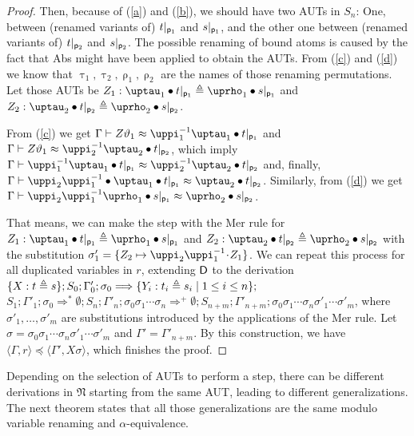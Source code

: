 \documentclass{llncs}
\newcommand{\Lra}{\Longrightarrow}
\newcommand{\frN}{\mathfrak N}
\newcommand{\permap}{{\mkern 1mu\cdot \mkern 1mu}}
\newcommand{\permef}{\bullet}
\newcommand\pos{{\sf p}}
\newcommand\ppi{\uppi}
\newcommand\prho{\uprho}
\newcommand\ptau{\uptau}
\newcommand{\np}[2]{\langle #1, \allowbreak #2\rangle}
\begin{document}
\begin{proof}
Then, because of (\ref{a}) and (\ref{b}), we should have two AUTs in $S_n$: One, between (renamed variants of) $t|_{\pos_1}$ and $s|_{\pos_1}$, and the other one between (renamed variants of) $t|_{\pos_2}$ and $s|_{\pos_2}$.  The possible renaming of bound atoms is caused by the fact that \textsf{Abs} might have been applied to obtain the AUTs. From (\ref{c}) and (\ref{d}) we know that $\ptau_1,\ptau_2,\prho_1,\prho_2$ are the names of those renaming permutations. Let those AUTs be $Z_1: \ptau_1\permef t|_{\pos_1} \triangleq \prho_1\permef s|_{\pos_1}$ and $Z_2 : \ptau_2\permef t|_{\pos_2} \triangleq \prho_2\permef s|_{\pos_2}$.

From (\ref{c}) we get $\Gamma \vdash  Z\vartheta_1 \approx \ppi_1^{-1} \ptau_1\permef t|_{\pos_1}$ and $\Gamma \vdash Z\vartheta_1 \approx \ppi_2^{-1} \ptau_2\permef t|_{\pos_2}$, which imply $\Gamma \vdash  \ppi_1^{-1} \ptau_1\permef t|_{\pos_1} \approx \ppi_2^{-1} \ptau_2\permef t|_{\pos_2} $ and, finally, $\Gamma \vdash \ppi_2 \ppi_1^{-1}\permef \ptau_1\permef t|_{\pos_1} \approx \ptau_2\permef t|_{\pos_2} $. Similarly, from (\ref{d}) we get $\Gamma \vdash  \ppi_2 \ppi_1^{-1} \prho_1\permef s|_{\pos_1} \approx \prho_2\permef s|_{\pos_2} $.

That means, we can make the step with the \textsf{Mer} rule for $Z_1: \ptau_1\permef t|_{\pos_1} \triangleq \prho_1\permef s|_{\pos_1}$ and $Z_2 : \ptau_2\permef t|_{\pos_2} \triangleq \prho_2\permef s|_{\pos_2}$ with the substitution $\sigma'_1=\{Z_2\mapsto \ppi_2 \ppi_1^{-1}\permap Z_1\}$.
%
We can repeat this process for all duplicated vari\-ables in $r$, extending $\sf D$ to the derivation
$\{X :t \triangleq \penalty10000 s \};S_0;\allowbreak \Gamma'_0; \sigma_0\Lra \{Y_i :t_i \triangleq s_i \mid 1\le i \le n\};$ $S_1;\Gamma'_1;\sigma_0 \Lra^* \emptyset; S_n;\Gamma'_n;
\sigma_0\sigma_1\cdots\sigma_n \Lra^+ \emptyset; S_{n+m}; \Gamma'_{n+m}; \allowbreak\sigma_0\sigma_1\cdots\sigma_n\sigma'_1\cdots\sigma'_m$, where $\sigma'_1,\ldots, \sigma'_m$ are substitutions introduced by the applications of the \textsf{Mer} rule. Let $\sigma =\sigma_0\sigma_1\cdots\sigma_n\sigma'_1\cdots\sigma'_m $ and $\Gamma'=\Gamma'_{n+m}$. By this construction, we have $\np{\Gamma}{r} \preceq \np{\Gamma'}{X\sigma}$, which finishes the proof.

\end{proof}


Depending on the selection of AUTs to perform a step, there can be different derivations in $\frN$ starting from the same AUT, leading to different generalizations. The next theorem states that all those generalizations are the same modulo variable renaming and $\alpha$-equivalence.
\end{document}
